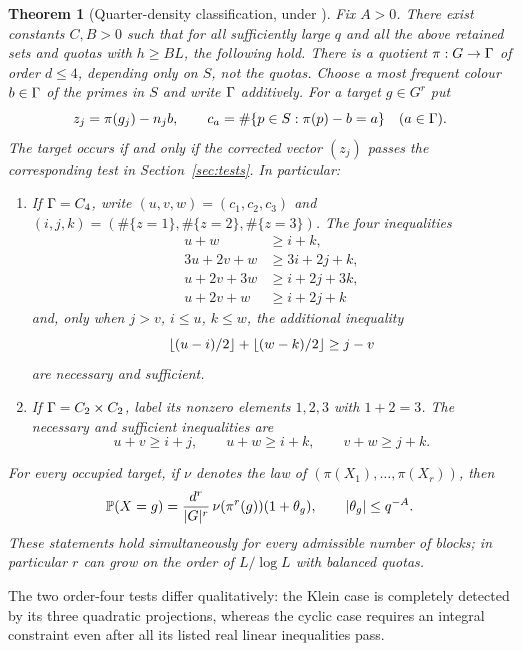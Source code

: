\documentclass[11pt]{article}
\newtheorem{theorem}{Theorem}[section]
\theoremstyle{remark}\newtheorem{remark}[theorem]{Remark}
\begin{document}
\begin{theorem}[Quarter-density classification, under \DGRH]\label{thm:main}
Fix $A>0$. There exist constants $C,B>0$ such that for all sufficiently large $q$ and all the above retained sets and quotas with $h\ge BL$, the following hold.
There is a quotient $\pi:G\to\Gamma$ of order $d\le4$, depending only on $S$, not the quotas. Choose a most frequent colour $b\in\Gamma$ of the primes in $S$ and write $\Gamma$ additively. For a target $g\in G^r$ put
\[
 z_j=\pi(g_j)-n_jb,\qquad c_a=\#\{p\in S:\pi(p)-b=a\}\quad(a\in\Gamma).
\]
The target occurs if and only if the corrected vector $(z_j)$ passes the corresponding test in Section~\ref{sec:tests}. In particular:
\begin{enumerate}[label=(\roman*)]
\item If $\Gamma=C_4$, write $(u,v,w)=(c_1,c_2,c_3)$ and $(i,j,k)=(\#\{z=1\},\#\{z=2\},\#\{z=3\})$. The four inequalities
\begin{align}
 u+w&\ge i+k,\label{eq:odd}\\
 3u+2v+w&\ge 3i+2j+k,\label{eq:cost1}\\
 u+2v+3w&\ge i+2j+3k,\label{eq:cost3}\\
 u+2v+w&\ge i+2j+k\label{eq:cost2}
\end{align}
and, only when $j>v$, $i\le u$, $k\le w$, the additional inequality
\begin{equation}\label{eq:parity}
 \left\lfloor (u-i)/2\right\rfloor+\left\lfloor (w-k)/2\right\rfloor\ge j-v
\end{equation}
are necessary and sufficient.
\item If $\Gamma=C_2\times C_2$, label its nonzero elements $1,2,3$ with $1+2=3$. The necessary and sufficient inequalities are
\begin{equation}\label{eq:klein}
 u+v\ge i+j,\qquad u+w\ge i+k,\qquad v+w\ge j+k.
\end{equation}
\end{enumerate}
For every occupied target, if $\nu$ denotes the law of $(\pi(X_1),\ldots,\pi(X_r))$, then
\begin{equation}\label{eq:lift}
 \mathbb P(X=g)=\frac{d^r}{|G|^r}\,\nu(\pi^r(g))(1+\theta_g),\qquad |\theta_g|\le q^{-A}.
\end{equation}
These statements hold simultaneously for every admissible number of blocks; in particular $r$ can grow on the order of $L/\log L$ with balanced quotas.
\end{theorem}

The two order-four tests differ qualitatively: the Klein case is completely detected by its three quadratic projections, whereas the cyclic case requires an integral constraint even after all its listed real linear inequalities pass.
\end{document}
